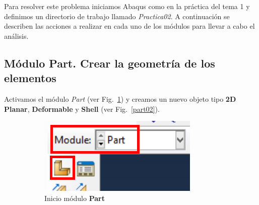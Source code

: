 Para resolver este problema iniciamos Abaqus como en la práctica del tema 1 y 
definimos un directorio de trabajo llamado \textit{Practica02}. A continuación
se describen las acciones a realizar en cada uno de los módulos para llevar
a cabo el análisis. 

\subsection{Módulo Part. Crear la geometría de los elementos}
Activamos el módulo \textit{Part} (ver Fig.~\ref{part01}) y creamos un
nuevo objeto tipo \textbf{2D Planar}, \textbf{Deformable} y
\textbf{Shell} (ver Fig.~\ref{part02}).

  \begin{figure}[!h]
    \centering
    \begin{subfigure}[!h]{0.29\textwidth}
      \includegraphics[width=\textwidth]{./body/images/part01.pdf}
      \caption{Inicio módulo \textbf{Part}}
      \label{part01}
    \end{subfigure}%
    ~ %
    \begin{subfigure}[!h]{0.39\textwidth}

\end{subfigure}
\end{figure}
